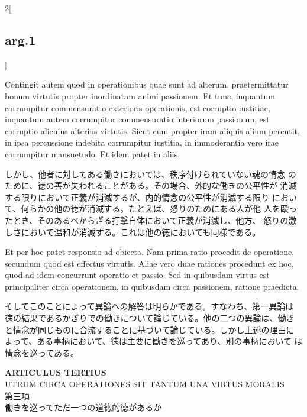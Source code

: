 \documentclass[paper=a4paper,fontsize=10pt,jafontsize=9pt,titlepage]{jlreq}
\begin{document}
\begin{paracol}{2}[\subsection{arg.1}]
\switchcolumn*

Contingit autem quod in operationibus quae sunt ad alterum,
 praetermittatur bonum virtutis propter inordinatam animi
 passionem. Et tunc, inquantum corrumpitur commensuratio exterioris
 operationis, est corruptio iustitiae, inquantum autem corrumpitur
 commensuratio interiorum passionum, est corruptio alicuius alterius
 virtutis. Sicut cum propter iram aliquis alium percutit, in ipsa
 percussione indebita corrumpitur iustitia, in immoderantia vero irae
 corrumpitur mansuetudo. Et idem patet in aliis.

\switchcolumn

しかし、他者に対してある働きにおいては、秩序付けられていない魂の情念
 のために、徳の善が失われることがある。その場合、外的な働きの公平性が
 消滅する限りにおいて正義が消滅するが、内的情念の公平性が消滅する限り
 において、何らかの他の徳が消滅する。たとえば、怒りのためにある人が他
 人を殴ったとき、そのあるべからざる打撃自体において正義が消滅し、他方、
 怒りの激しさにおいて温和が消滅する。これは他の徳においても同様である。

\switchcolumn*

Et per hoc patet responsio ad obiecta. Nam prima ratio procedit de
 operatione, secundum quod est effectus virtutis. Aliae vero duae
 rationes procedunt ex hoc, quod ad idem concurrunt operatio et
 passio. Sed in quibusdam virtus est principaliter circa operationem,
 in quibusdam circa passionem, ratione praedicta.

\switchcolumn

そしてこのことによって異論への解答は明らかである。すなわち、第一異論は
徳の結果であるかぎりでの働きについて論じている。他の二つの異論は、働き
と情念が同じものに合流することに基づいて論じている。しかし上述の理由に
よって、ある事柄において、徳は主要に働きを巡ってあり、別の事柄において
は情念を巡ってある。

\end{paracol}
\newpage
{}
{}
\setcounter{section}{3}
\setcounter{subsection}{0}


\begin{center}
{\Large {\bfseries ARTICULUS TERTIUS}}\\
{\large UTRUM CIRCA OPERATIONES SIT TANTUM UNA VIRTUS MORALIS}\\
{\Large 第三項\\働きを巡ってただ一つの道徳的徳があるか}
\end{center}
\end{document}
